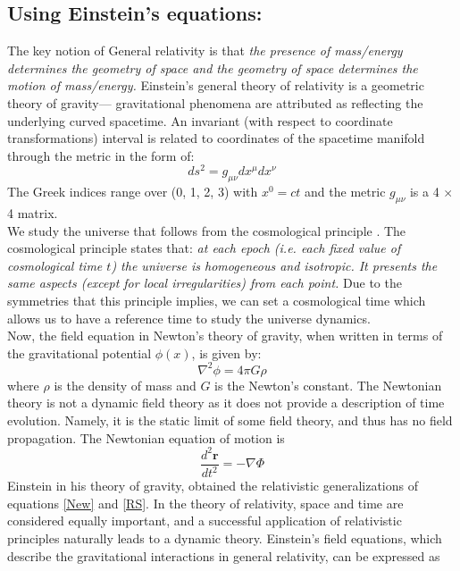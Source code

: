 \documentclass[12pt]{article}
\begin{document}
\subsection{Using Einstein's equations:} 
The key notion of General relativity is that \textit{the presence of mass/energy determines the geometry of space and the geometry of space determines the motion of mass/energy.} Einstein’s general theory of relativity is a geometric theory of gravity— gravitational phenomena are attributed as reflecting the underlying curved spacetime. An invariant (with respect to coordinate transformations) interval is related to coordinates of the spacetime manifold through the metric in the form of:
\begin{equation}
d s^{2}=g_{\mu \nu} d x^{\mu} d x^{\nu}
\label{MT}
\end{equation}
The Greek indices range over (0, 1, 2, 3) with $x^{0} = ct$ and the metric  $g_{\mu \nu}$ is a 4 $\times$ 4 matrix.\\
We study the universe that follows from the cosmological principle \cite{Schwarz_2009}. The cosmological principle states that: \textit{at each epoch (i.e. each fixed value of cosmological time $t$) the universe is homogeneous and isotropic. It presents the same aspects (except for local irregularities) from each point.} Due  to  the symmetries that this principle implies, we can set a cosmological time  which allows us to have a reference time to study the universe dynamics.\\
Now, the field equation in Newton’s theory of gravity, when written in terms of the gravitational potential $\phi(x)$, is given by:
\begin{equation}
\nabla^{2} \phi=4 \pi G \rho
\label{New}
\end{equation}
where $\rho$ is the density of mass and $G$ is the Newton's constant. The
Newtonian theory is not a dynamic field theory as it does not provide a description of time evolution. Namely, it is the static limit of some field theory, and thus has no field propagation. The Newtonian equation of motion is
\begin{equation}
\frac{d^{2} \mathbf{r}}{d t^{2}}=-\nabla \Phi
\label{RS}
\end{equation}
Einstein in his theory of gravity, obtained the relativistic generalizations of equations \eqref{New} and \eqref{RS}. In the theory of relativity, space and time are considered equally important, and a successful application of relativistic principles naturally leads to a dynamic theory. Einstein's field equations, which describe the gravitational interactions in general relativity, can be expressed as \cite{narlikar_hoyle_cosmology}
\end{document}
